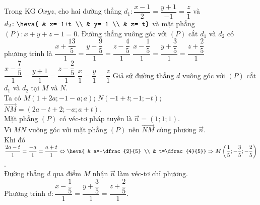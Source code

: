\begin{ex}%
Trong KG $Oxyz$, cho hai đường thẳng $d_1\colon \dfrac{x-1}{2}=\dfrac{y+1}{-1}=\dfrac{z}{1}$ và $d_2\colon \heva{ & x=-1+t \\ & y=-1 \\ & z=-t}$ và mặt phẳng $(P)\colon x+y+z-1=0$. Đường thẳng vuông góc với $(P)$ cắt $d_1$ và $d_2$ có phương trình là
\choice
{$\dfrac{x+\dfrac{13}{5}}{1}=\dfrac{y-\dfrac{9}{5}}{1}=\dfrac{z-\dfrac{4}{5}}{1}$}
{\True $\dfrac{x-\dfrac{1}{5}}{1}=\dfrac{y+\dfrac{3}{5}}{1}=\dfrac{z+\dfrac{2}{5}}{1}$}
{$\dfrac{x-\dfrac{7}{5}}{1}=\dfrac{y+1}{1}=\dfrac{z-\dfrac{2}{5}}{1}$}
{$\dfrac{x}{1}=\dfrac{y}{1}=\dfrac{z}{1}$}
\loigiai
{
Giả sử đường thẳng $d$ vuông góc với $(P)$ cắt $d_1$ và $d_2$ tại $M$ và $N$.\\
Ta có $M(1+2a;-1-a;a)$; $N(-1+t;-1;-t)$; $\overrightarrow{NM}=(2a-t+2;-a;a+t)$.\\
Mặt phẳng $(P)$ có véc-tơ pháp tuyến là $\overrightarrow{n}=(1;1;1)$.\\
Vì $MN$ vuông góc với mặt phẳng $(P)$ nên $\overrightarrow{NM}$ cùng phương $\overrightarrow{n}$.\\
Khi đó $\dfrac{2a-t}{1}=\dfrac{-a}{1}=\dfrac{a+t}{1} \Leftrightarrow \heva{ & a=-\dfrac{2}{5} \\ & t=\dfrac{4}{5}} \Rightarrow M\left(\dfrac{1}{5};-\dfrac{3}{5};-\dfrac{2}{5}\right)$.\\
Đường thẳng $d$ qua điểm $M$ nhận $\overrightarrow{n}$ làm véc-tơ chỉ phương.\\
Phương trình $d\colon \dfrac{x-\dfrac{1}{5}}{1}=\dfrac{y+\dfrac{3}{5}}{1}=\dfrac{z+\dfrac{2}{5}}{1}$.
}
\end{ex}

